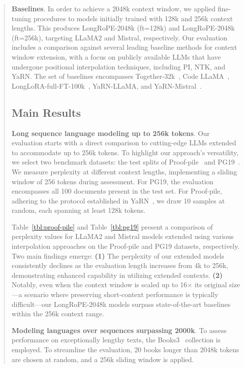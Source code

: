 \begin{abstract}
\textbf{Baselines}. In order to achieve a 2048k context window, we applied fine-tuning procedures to models initially trained with 128k and 256k context lengths. This produces LongRoPE-2048k (ft=128k) and LongRoPE-2048k (ft=256k), targeting LLaMA2 and Mistral, respectively. Our evaluation includes a comparison against several leading baseline methods for context window extension, with a focus on publicly available LLMs that have undergone positional interpolation techniques, including PI, NTK, and YaRN. The set of baselines encompasses Together-32k~\cite{together}, Code LLaMA~\cite{codellama}, LongLoRA-full-FT-100k~\cite{longlora}, YaRN-LLaMA, and YaRN-Mistral~\cite{yarn}.

\subsection{Main Results}

\label{sec:mainresult}
\textbf{Long sequence language modeling up to 256k tokens}. Our evaluation starts with a direct comparison to cutting-edge LLMs extended to accommodate up to 256k tokens. To highlight our approach’s versatility, we select two benchmark datasets: the test splits of Proof-pile~\cite{pg19} and PG19~\cite{pile}. We measure perplexity at different context lengths, implementing a sliding window of 256 tokens during assessment. For PG19, the evaluation encompasses all 100 documents present in the test set. For Proof-pile, adhering to the protocol established in YaRN~\cite{yarn}, we draw 10 samples at random, each spanning at least 128k tokens.

Table~\ref{tbl:proof-pile} and Table~\ref{tbl:pg19} present a comparison of perplexity values for LLaMA2 and Mistral models extended using various interpolation approaches on the Proof-pile and PG19 datasets, respectively. Two main findings emerge: \textbf{(1)} The perplexity of our extended models consistently declines as the evaluation length increases from 4k to 256k, demonstrating enhanced capability in utilizing extended contexts. \textbf{(2)} Notably, even when the context window is scaled up to 16$\times$ its original size—a scenario where preserving short-context performance is typically difficult—our LongRoPE-2048k models surpass state-of-the-art baselines within the 256k context range.

\textbf{Modeling languages over sequences surpassing 2000k}. To assess performance on exceptionally lengthy texts, the Books3~\cite{pile} collection is employed. To streamline the evaluation, 20 books longer than 2048k tokens are chosen at random, and a 256k sliding window is applied.


\end{abstract}
